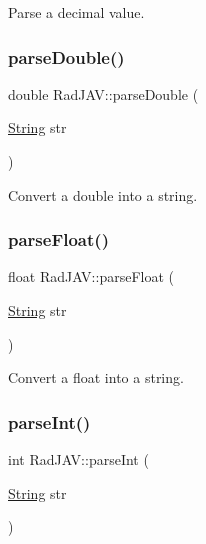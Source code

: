 Parse a decimal value. 

\mbox{\label{namespace_rad_j_a_v_a6aeeb0a6113b36fc86478e43a2792935}} 
\subsubsection{\texorpdfstring{parse\+Double()}{parseDouble()}}
{\footnotesize\ttfamily double Rad\+J\+A\+V\+::parse\+Double (\begin{DoxyParamCaption}\item[{\mbox{\hyperlink{class_rad_j_a_v_1_1_string}{String}}}]{str }\end{DoxyParamCaption})}



Convert a double into a string. 

\mbox{\label{namespace_rad_j_a_v_a5ca1dcc1c7f181ae77b19c1b3c31a70a}} 
\subsubsection{\texorpdfstring{parse\+Float()}{parseFloat()}}
{\footnotesize\ttfamily float Rad\+J\+A\+V\+::parse\+Float (\begin{DoxyParamCaption}\item[{\mbox{\hyperlink{class_rad_j_a_v_1_1_string}{String}}}]{str }\end{DoxyParamCaption})}



Convert a float into a string. 

\mbox{\label{namespace_rad_j_a_v_a49f8eb01edf646954f8695daccc62fd6}} 
\subsubsection{\texorpdfstring{parse\+Int()}{parseInt()}}
{\footnotesize\ttfamily int Rad\+J\+A\+V\+::parse\+Int (\begin{DoxyParamCaption}\item[{\mbox{\hyperlink{class_rad_j_a_v_1_1_string}{String}}}]{str }\end{DoxyParamCaption})}



